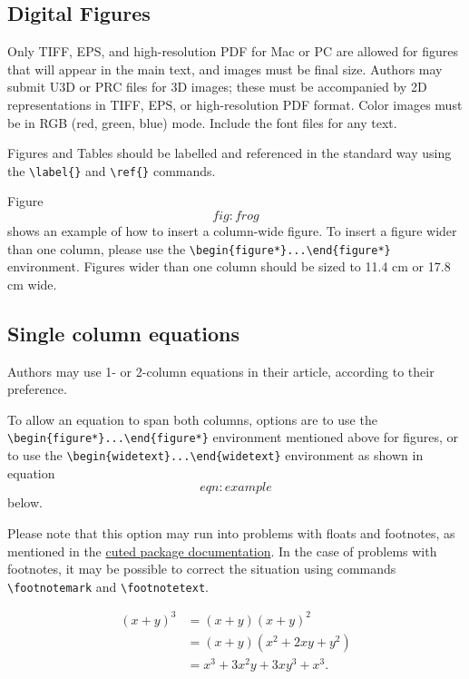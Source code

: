 \documentclass[9pt,twocolumn,twoside,]{pnas-new}
\begin{document}
\hypertarget{sec:figures}{%
\subsection{Digital Figures}\label{sec:figures}}

Only TIFF, EPS, and high-resolution PDF for Mac or PC are allowed for
figures that will appear in the main text, and images must be final
size. Authors may submit U3D or PRC files for 3D images; these must be
accompanied by 2D representations in TIFF, EPS, or high-resolution PDF
format. Color images must be in RGB (red, green, blue) mode. Include the
font files for any text.

Figures and Tables should be labelled and referenced in the standard way
using the \texttt{\textbackslash{}label\{\}} and
\texttt{\textbackslash{}ref\{\}} commands.

Figure \[fig:frog\] shows an example of how to insert a column-wide
figure. To insert a figure wider than one column, please use the
\texttt{\textbackslash{}begin\{figure*\}...\textbackslash{}end\{figure*\}}
environment. Figures wider than one column should be sized to 11.4 cm or
17.8 cm wide.

\hypertarget{single-column-equations}{%
\subsection*{Single column equations}\label{single-column-equations}}

Authors may use 1- or 2-column equations in their article, according to
their preference.

To allow an equation to span both columns, options are to use the
\texttt{\textbackslash{}begin\{figure*\}...\textbackslash{}end\{figure*\}}
environment mentioned above for figures, or to use the
\texttt{\textbackslash{}begin\{widetext\}...\textbackslash{}end\{widetext\}}
environment as shown in equation \[eqn:example\] below.

Please note that this option may run into problems with floats and
footnotes, as mentioned in the \href{http://texdoc.net/pkg/cuted}{cuted
package documentation}. In the case of problems with footnotes, it may
be possible to correct the situation using commands
\texttt{\textbackslash{}footnotemark} and
\texttt{\textbackslash{}footnotetext}.

\[\begin{aligned}
(x+y)^3&=(x+y)(x+y)^2\\
       &=(x+y)(x^2+2xy+y^2) \label{eqn:example} \\
       &=x^3+3x^2y+3xy^3+x^3. 
\end{aligned}\]
\end{document}
